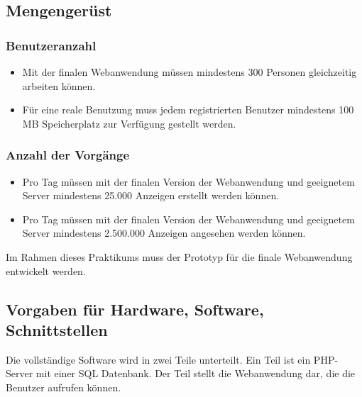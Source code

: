 \documentclass[a4paper,12pt,oneside]{scrartcl}
\begin{document}
\subsection{Mengengerüst}

\subsubsection*{Benutzeranzahl}
\begin{itemize}
	\item Mit der finalen Webanwendung müssen mindestens 300 Personen gleichzeitig arbeiten können. 
	\item Für eine reale Benutzung muss jedem registrierten Benutzer mindestens 100 MB Speicherplatz zur Verfügung gestellt werden. 
\end{itemize}

\subsubsection*{Anzahl der Vorgänge}
\begin{itemize}
	\item Pro Tag müssen mit der finalen Version der Webanwendung und geeignetem Server mindestens 25.000 Anzeigen erstellt werden können. 
	\item Pro Tag müssen mit der finalen Version der Webanwendung und geeignetem Server mindestens 2.500.000 Anzeigen angesehen werden können.
\end{itemize}
Im Rahmen dieses Praktikums muss der Prototyp für die finale Webanwendung entwickelt werden.


\subsection{Vorgaben für Hardware, Software, Schnittstellen}
Die vollständige Software wird in zwei Teile unterteilt.
Ein Teil ist ein PHP-Server mit einer SQL Datenbank. Der Teil stellt die Webanwendung dar, die die Benutzer aufrufen können.
\end{document}
